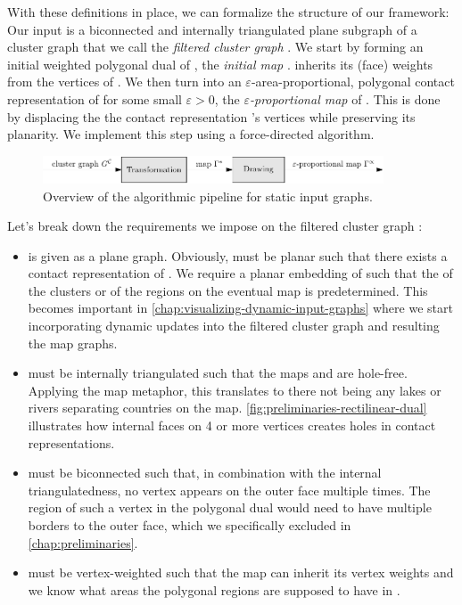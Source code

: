 With these definitions in place, we can formalize the structure of our framework:
Our input is a biconnected and internally triangulated plane subgraph of a cluster graph that we call the \emph{filtered cluster graph} \clustergraph{}.
We start by forming an initial weighted polygonal dual of \clustergraph{}, the \emph{initial map} \initmap{}.
\initmap{} inherits its (face) weights from the vertices of \clustergraph{}.
We then turn \initmap{} into an $\varepsilon$-area-proportional, polygonal contact representation of \clustergraph{} for some small $\varepsilon > 0$, the \emph{$\varepsilon$-proportional map} \propmap{} of \clustergraph{}.
This is done by displacing the the contact representation \initmap{}'s vertices while preserving its planarity.
We implement this step using a force-directed algorithm.

\begin{figure}[H]
	\centering\includegraphics[width=0.9\textwidth]{Resources/Framework-1.pdf}
	\caption{Overview of the algorithmic pipeline for static input graphs.}
	\label{fig:static-pipeline-thesis}
\end{figure}

Let's break down the requirements we impose on the filtered cluster graph \clustergraph{}:

\begin{itemize}
\item \clustergraph{} is given as a plane graph.
Obviously, \clustergraph{} must be planar such that there exists a contact representation of \clustergraph{}.
We require a planar embedding of \clustergraph{} such that the  of the clusters or of the regions on the eventual map is predetermined.
This becomes important in \cref{chap:visualizing-dynamic-input-graphs} where we start incorporating dynamic updates into the filtered cluster graph and resulting the map graphs.
\item \clustergraph{} must be internally triangulated such that the maps \initmap{} and \propmap{} are hole-free.
Applying the map metaphor, this translates to there not being any lakes or rivers separating countries on the map.
\cref{fig:preliminaries-rectilinear-dual} illustrates how internal faces on 4 or more vertices creates holes in contact representations.
\item \clustergraph{} must be biconnected such that, in combination with the internal triangulatedness, no vertex appears on the outer face multiple times.
The region of such a vertex in the polygonal dual would need to have multiple borders to the outer face, which we specifically excluded in \cref{chap:preliminaries}.
\item \clustergraph{} must be vertex-weighted such that the map \initmap{} can inherit its vertex weights and we know what areas the polygonal regions are supposed to have in \propmap{}.
\end{itemize}

